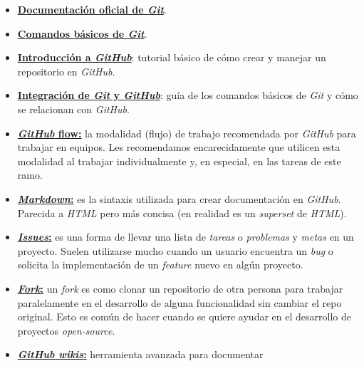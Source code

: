     \begin{itemize}
      \item \href{https://git-scm.com}{\textbf{Documentación oficial de 
        \textit{Git}}}.
      \item \href{https://rogerdudler.github.io/git-guide/}{\textbf{Comandos básicos 
        de \textit{Git}}}.
      \item \href{https://guides.github.com/activities/hello-world/}{
        \textbf{Introducción a \textit{GitHub}}}: tutorial básico de cómo crear y 
        manejar un repositorio en \textit{GitHub}. 
      \item \href{https://guides.github.com/introduction/git-handbook/}{
        \textbf{Integración de \textit{Git} y \textit{GitHub}}}: guía de los comandos 
        básicos de \textit{Git} y cómo se relacionan con \textit{GitHub}.
      \item \href{https://guides.github.com/introduction/flow/}{\textbf{
        \textit{GitHub} flow:}} la modalidad (flujo) de trabajo recomendada por 
        \textit{GitHub} para trabajar en equipos.
        Les recomendamos encarecidamente que utilicen esta modalidad al trabajar 
        individualmente y, en especial, en las tareas de este ramo.
      \item \href{https://guides.github.com/features/mastering-markdown/}{
        \textbf{\textit{Markdown}:}} es la sintaxis utilizada para crear documentación
        en \textit{GitHub}.
        Parecida a \textit{HTML} pero más concisa (en realidad es un \textit{superset}
        de \textit{HTML}). 
      \item \href{https://guides.github.com/features/issues/}{
        \textbf{\textit{Issues}:}} es una forma de llevar una lista de \textit{tareas}
        o \textit{problemas} y \textit{metas} en un proyecto.
        Suelen utilizarse mucho cuando un usuario encuentra un \textit{bug} o solicita
        la implementación de un \textit{feature} nuevo en algún proyecto.
      \item \href{https://guides.github.com/activities/forking/}{
        \textbf{\textit{Fork}:}} un \textit{fork} es como clonar un repositorio de 
        otra persona para trabajar paralelamente en el desarrollo de alguna 
        funcionalidad sin cambiar el repo original.
        Esto es común de hacer cuando se quiere ayudar en el desarrollo de proyectos 
        \textit{open-source}.
      \item \href{https://guides.github.com/features/wikis/}{
        \textbf{\textit{GitHub wikis}:}} herramienta avanzada para documentar 

\end{itemize}
